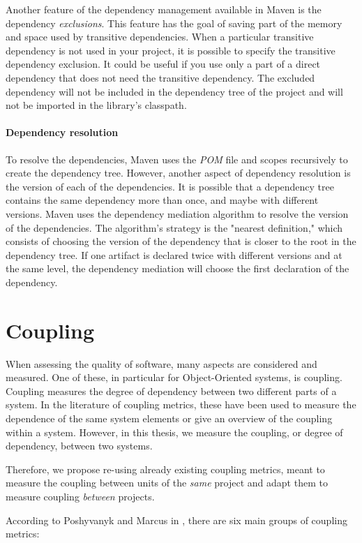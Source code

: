 Another feature of the dependency management available in Maven is the dependency \textit{exclusions}. This feature has the goal of saving part of the memory and space used by transitive dependencies. When a particular transitive dependency is not used in your project, it is possible to specify the transitive dependency exclusion. It could be useful if you use only a part of a direct dependency that does not need the transitive dependency. The excluded dependency will not be included in the dependency tree of the project and will not be imported in the library's classpath.

\paragraph{Dependency resolution}
To resolve the dependencies, Maven uses the \textit{POM} file and scopes recursively to create the dependency tree. However, another aspect of dependency resolution is the version of each of the dependencies. It is possible that a dependency tree contains the same dependency more than once, and maybe with different versions. Maven uses the dependency mediation algorithm to resolve the version of the dependencies. The algorithm's strategy is the "nearest definition," which consists of choosing the version of the dependency that is closer to the root in the dependency tree. If one artifact is declared twice with different versions and at the same level, the dependency mediation will choose the first declaration of the dependency.

\section{Coupling}\label{section:bg-coupling}
When assessing the quality of software, many aspects are considered and measured. One of these, in particular for Object-Oriented systems, is coupling. Coupling measures the degree of dependency between two different parts of a system. In the literature of coupling metrics, these have been used to measure the dependence of the same system elements or give an overview of the coupling within a system. However, in this thesis, we measure the coupling, or degree of dependency, between two systems.

Therefore, we propose re-using already existing coupling metrics, meant to measure the coupling between units of the \textit{same} project and adapt them to measure coupling \textit{between} projects.

\blankl
According to Poshyvanyk and Marcus in \cite{poshyvanyk2006conceptual}, there are six main groups of coupling metrics:

